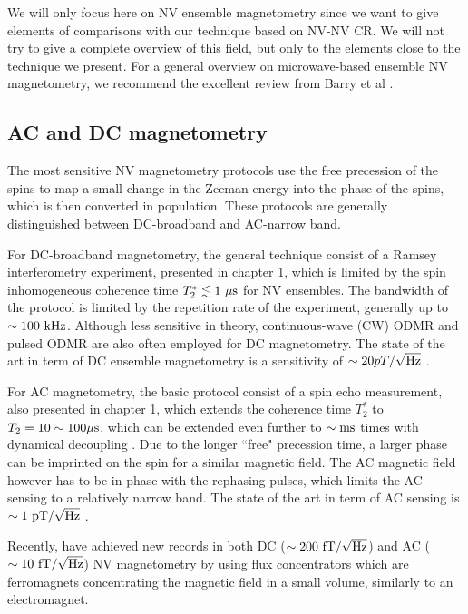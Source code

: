 \documentclass[a4paper,11pt]{report}
\begin{document}
We will only focus here on NV ensemble magnetometry since we want to give elements of comparisons with our technique based on NV-NV CR. We will not try to give a complete overview of this field, but only to the elements close to the technique we present. For a general overview on microwave-based ensemble NV magnetometry, we recommend the excellent review from Barry et al \citep{barry2020sensitivity}.

\subsection{AC and DC magnetometry}
The most sensitive NV magnetometry protocols use the free precession of the spins to map a small change in the Zeeman energy into the phase of the spins, which is then converted in population. These protocols are generally distinguished between DC-broadband and AC-narrow band.

For DC-broadband magnetometry, the general technique consist of a Ramsey interferometry experiment, presented in chapter 1, which is limited by the spin inhomogeneous coherence time $T_2^* \lesssim 1\ \rm{\mu s}$ for NV ensembles. The bandwidth of the protocol is limited by the repetition rate of the experiment, generally up to $\sim 100\ \rm kHz$. Although less sensitive in theory, continuous-wave (CW) ODMR and pulsed ODMR are also often employed for DC magnetometry. The state of the art in term of DC ensemble magnetometry is a sensitivity of $\sim 20 pT/ \sqrt{\rm Hz}$ \citep{barry2016optical, chatzidrosos2017miniature}.

For AC magnetometry, the basic protocol consist of a spin echo measurement, also presented in chapter 1, which extends the coherence time $T_2^*$ to $T_2 = 10 \sim 100 \rm{\mu s}$, which can be extended even further to $\sim \rm ms$ times with dynamical decoupling \citep{pham2012enhanced}. Due to the longer ``free" precession time, a larger phase can be imprinted on the spin for a similar magnetic field. The AC magnetic field however has to be in phase with the rephasing pulses, which limits the AC sensing to a relatively narrow band. The state of the art in term of AC sensing is $\sim 1\ \rm pT/\sqrt{\rm Hz}$ \citep{wolf2015subpicotesla}.

Recently, \citep{xie2021hybrid} have achieved new records in both DC ($\sim 200\ \rm fT/\sqrt{\rm Hz}$) and AC ($\sim 10\ \rm fT/\sqrt{\rm Hz}$) NV magnetometry by using flux concentrators which are ferromagnets concentrating the magnetic field in a small volume, similarly to an electromagnet.
\end{document}
